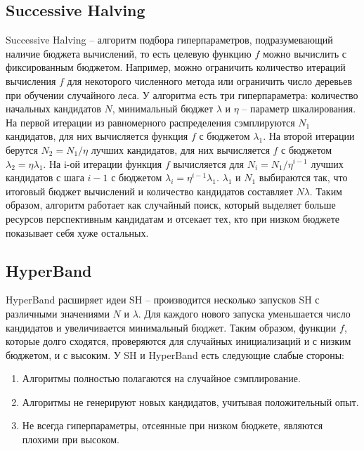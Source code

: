 \documentclass[a4paper,12pt]{article}
\begin{document}
\subsection{Successive Halving}
Successive Halving -- алгоритм подбора гиперпараметров, подразумевающий наличие бюджета вычислений, то есть целевую функцию $f$ можно вычислить с фиксированным бюджетом. Например, можно ограничить количество итераций вычисления $f$ для некоторого численного метода или ограничить число деревьев при обучении случайного леса. 
У алгоритма есть три гиперпараметра: количество начальных кандидатов $N$, минимальный бюджет $\lambda$ и $\eta$ -- параметр шкалирования. На первой итерации из равномерного распределения сэмплируются $N_1$ кандидатов, для них вычисляется функция $f$ с бюджетом $\lambda_1$. На второй итерации берутся $N_2 = N_1/\eta$ лучших кандидатов, для них вычисляется $f$ с бюджетом $\lambda_2 = \eta\lambda_1$. На i-ой итерации функция $f$ вычисляется для $N_i = N_1/\eta^{i - 1}$ лучших кандидатов с шага $i - 1$ с бюджетом $\lambda_i = \eta^{i - 1}\lambda_1$. $\lambda_1$ и $N_1$ выбираются так, что итоговый бюджет вычислений и количество кандидатов составляет $N\lambda$.  Таким образом, алгоритм работает как случайный поиск, который выделяет больше ресурсов перспективным кандидатам и отсекает тех, кто при низком бюджете показывает себя хуже остальных.

\subsection{HyperBand}
HyperBand расширяет идеи SH -- производится несколько запусков SH с различными значениями $N$ и $\lambda$. Для каждого нового запуска уменьшается число кандидатов и увеличивается минимальный бюджет. Таким образом, функции $f$, которые долго сходятся, проверяются для случайных инициализаций и с низким бюджетом, и с высоким. 
У SH и HyperBand есть следующие слабые стороны:
\begin{enumerate}
    \item Алгоритмы полностью полагаются на случайное сэмплирование.
    \item Алгоритмы не генерируют новых кандидатов, учитывая положительный опыт.
    \item Не всегда гиперпараметры, отсеянные при низком бюджете, являются плохими при высоком.
\end{enumerate}
\end{document}
